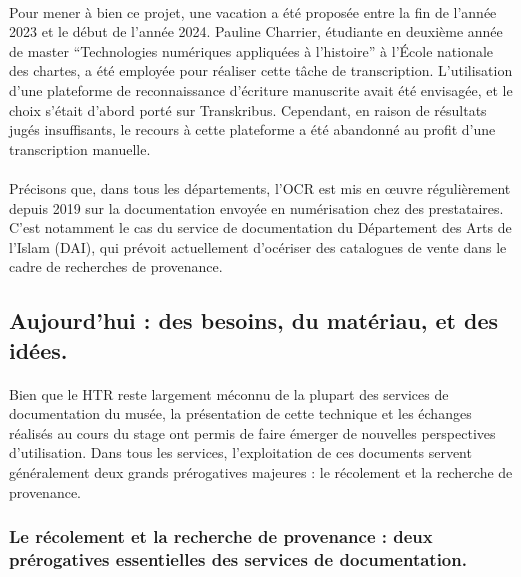 \documentclass[a4paper,12pt,twoside]{book}
\begin{document}
\paragraph{}
Pour mener à bien ce projet, une vacation a été proposée entre la fin de l'année 2023 et le début de l'année 2024. Pauline Charrier, étudiante en deuxième année de master \enquote{Technologies numériques appliquées à l’histoire} à l’École nationale des chartes, a été employée pour réaliser cette tâche de transcription. L’utilisation d’une plateforme de reconnaissance d’écriture manuscrite avait été envisagée, et le choix s'était d'abord porté sur Transkribus. Cependant, en raison de résultats jugés insuffisants, le recours à cette plateforme a été abandonné au profit d’une transcription manuelle. 

\paragraph{}
Précisons que, dans tous les départements, l’OCR est mis en œuvre régulièrement depuis 2019 sur la documentation envoyée en numérisation chez des prestataires. C’est notamment le cas du service de documentation du Département des Arts de l'Islam (DAI), qui prévoit actuellement d'océriser des catalogues de vente dans le cadre de recherches de provenance.

\subsection{Aujourd’hui : des besoins, du matériau, et des idées.}

\paragraph{}
Bien que le HTR reste largement méconnu de la plupart des services de documentation du musée, la présentation de cette technique et les échanges réalisés au cours du stage ont permis de faire émerger de nouvelles perspectives d'utilisation. Dans tous les services, l’exploitation de ces documents servent généralement deux grands prérogatives majeures  : le récolement et la recherche de provenance. 

\subsubsection{Le récolement et la recherche de provenance : deux prérogatives essentielles des services de documentation.
}
\end{document}
